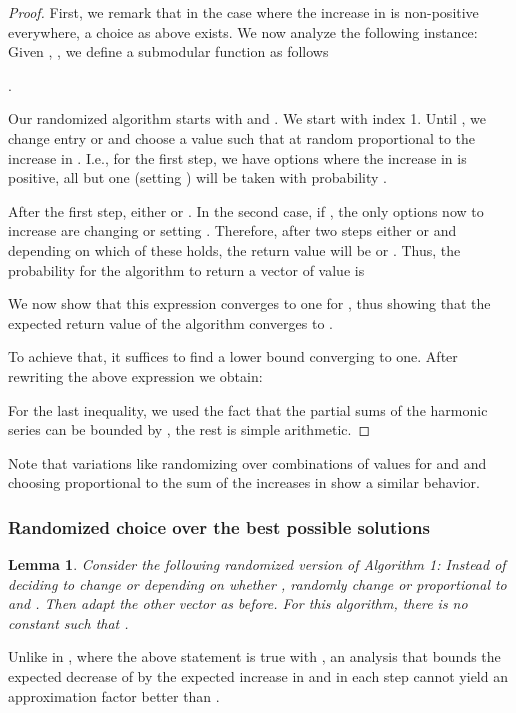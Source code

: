 \documentclass{article}
\theoremstyle{plain}
\newtheorem{lemma}[theorem]{Lemma}
\theoremstyle{definition}
\begin{document}
\begin{proof}
First, we remark that in the case where the increase in  is non-positive everywhere, a choice as above exists.    
We now analyze the following instance: Given  , , 
 we define a submodular function  as follows

.
	
Our randomized algorithm starts with  and . 
We start with index 1. Until , we change entry  or  and choose a value such that  
at random proportional to the increase in . 
I.e., for the first step, we have  options where the increase in  is positive, 
all but one (setting ) will be taken with probability . 



After the first step, either  or . In the second case, if , the only options now to increase  are 
changing  or setting .  
Therefore, after two steps either  or  and depending on which of these holds, the return value will be  or . 
Thus, the probability for the algorithm to return a vector of value  is

We now show that this expression converges to one for , thus showing that 
the expected return value of the algorithm converges to .

To achieve that, it suffices to find a lower bound converging to one. After rewriting the above expression we obtain: 
 
For the last inequality, we used the fact that the partial sums of the harmonic series can be bounded by , 
the rest is simple arithmetic.  
\end{proof}
Note that variations like randomizing over combinations of values for  and  
and choosing proportional to the sum of the increases in  show a similar behavior. 

\subsubsection{Randomized choice over the best possible solutions}\label{subsec:RandBadBestOptions}

\begin{lemma}
Consider the following randomized version of Algorithm 1: Instead of deciding to change  or  depending on whether
, 
randomly change  or  proportional to  and .
Then adapt the other vector as before. 
For this algorithm, there is no constant  such that 
.
\end{lemma}

Unlike in \cite{DoubleGreedy}, where the above statement is true with ,
an analysis that bounds the expected decrease of  by the expected increase in  and  in each step cannot
yield an approximation factor better than . 
\end{document}
